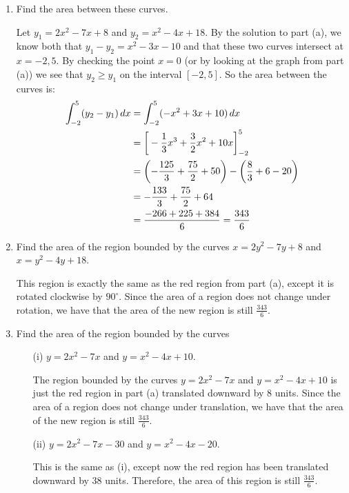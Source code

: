 \documentclass[noinstructornotes]{ximera}
\begin{document}
\begin{problem}
\begin{enumerate}
		\item  Find the area between these curves.
		\begin{freeResponse}
		Let $y_1 = 2x^2-7x+8$ and $y_2=x^2-4x+18$.  
		By the solution to part (a), we know both that $y_1 - y_2 = x^2 - 3x - 10$ and that these two curves intersect at $x=-2, 5$.  
		By checking the point $x=0$ (or by looking at the graph from part (a)) we see that $y_2 \geq y_1$ on the interval $[-2,5]$.  
		So the area between the curves is:
			\begin{align*}
			\int_{-2}^5 (y_2 - y_1) \,d x &= \int_{-2}^5 (-x^2 + 3x + 10) \,d x  \\
			&= \bigg[ -\frac{1}{3} x^3 + \frac{3}{2} x^2 + 10x \bigg]_{-2}^5  \\
			&= \left(- \frac{125}{3} + \frac{75}{2} + 50 \right) - \left( \frac{8}{3} + 6 - 20 \right)  \\
			&= - \frac{133}{3} + \frac{75}{2} + 64  \\
			&= \frac{-266 + 225 + 384}{6} = \frac{343}{6}
			\end{align*}
		\end{freeResponse}
		
		\item  Find the area of the region bounded by the curves $x=2y^2-7y+8$ and $x=y^2-4y+18$.
		\begin{freeResponse}
		This region is exactly the same as the {\color{red} red region} from part (a), except it is rotated clockwise by $90^{\circ}$.  
		Since the area of a region does not change under rotation, we have that the area of the new region is still $\frac{343}{6}$.  
		\end{freeResponse}
		
		\item  Find the area of the region bounded by the curves
			\begin{enumerate}
				\item[(i)]  $y = 2x^2 - 7x$ and $y=x^2 - 4x + 10$.
				\begin{freeResponse}
				The region bounded by the curves $y = 2x^2 - 7x$ and $y=x^2 - 4x + 10$ is just the {\color{red} red region} in part (a) translated downward by 8 units.  
				Since the area of a region does not change under translation, we have that the area of the new region is still $\frac{343}{6}$.  
				\end{freeResponse}
				
				\item[(ii)]  $y=2x^2-7x-30$ and $y=x^2-4x-20$.
				\begin{freeResponse}
				This is the same as (i), except now the {\color{red} red region} has been translated downward by 38 units.  
				Therefore, the area of this region is still $\frac{343}{6}$.  
				\end{freeResponse}
				

\end{enumerate}
\end{enumerate}
\end{problem}
\end{document}
